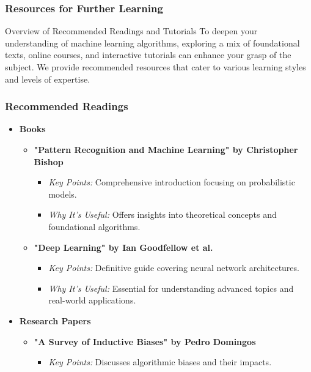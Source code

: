 \documentclass[aspectratio=169]{beamer}
\begin{document}
\begin{frame}[fragile]
    \frametitle{Resources for Further Learning}
    \begin{block}{Overview of Recommended Readings and Tutorials}
        To deepen your understanding of machine learning algorithms, exploring a mix of foundational texts, online courses, and interactive tutorials can enhance your grasp of the subject. We provide recommended resources that cater to various learning styles and levels of expertise.
    \end{block}
\end{frame}

\begin{frame}[fragile]
    \frametitle{Recommended Readings}
    \begin{itemize}
        \item \textbf{Books}
            \begin{itemize}
                \item \textbf{"Pattern Recognition and Machine Learning" by Christopher Bishop}
                    \begin{itemize}
                        \item \textit{Key Points:} Comprehensive introduction focusing on probabilistic models.
                        \item \textit{Why It’s Useful:} Offers insights into theoretical concepts and foundational algorithms.
                    \end{itemize}
                \item \textbf{"Deep Learning" by Ian Goodfellow et al.}
                    \begin{itemize}
                        \item \textit{Key Points:} Definitive guide covering neural network architectures.
                        \item \textit{Why It’s Useful:} Essential for understanding advanced topics and real-world applications.
                    \end{itemize}
            \end{itemize}
        \item \textbf{Research Papers}
            \begin{itemize}
                \item \textbf{"A Survey of Inductive Biases" by Pedro Domingos}
                    \begin{itemize}
                        \item \textit{Key Points:} Discusses algorithmic biases and their impacts.

\end{itemize}
\end{itemize}
\end{itemize}
\end{frame}
\end{document}
